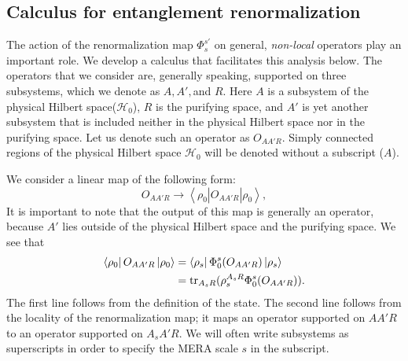 \documentclass[a4paper,11pt]{article}
\newcommand{\bra}[1]{\left\langle #1 \right|}
\newcommand{\ket}[1]{\left|#1\right\rangle}
\newcommand{\1}{\mathbbm{1}}
\newcommand{\cH}{\mathcal{H}}
\newcommand{\tr}{{\rm tr}}
\begin{document}
\subsection{Calculus for entanglement renormalization}
The action of the renormalization map $\Phi_s^{s'}$ on general, \emph{non-local} operators play an important role. We develop a calculus that facilitates this analysis below. The operators that we consider are, generally speaking, supported on three subsystems, which we denote as $A,A', $and $R$. Here $A$ is a subsystem of the physical Hilbert space($\mathcal{H}_0$), $R$ is the purifying space, and $A'$ is yet another subsystem that is included neither in the physical Hilbert space nor in the purifying space. Let us denote such an operator as $O_{AA'R}$. Simply connected regions of the physical Hilbert space $\cH_0$ will be denoted without a subscript ($A$).

We consider a linear map of the following form:
\begin{equation}
O_{AA'R} \to \bra{\rho_0} O_{AA'R} \ket{\rho_0},
\end{equation}
It is important to note that the output of this map is generally an operator, because $A'$ lies outside of the physical Hilbert space and the purifying space. We see that
\begin{align}
\bra{\rho_0} O_{AA'R} \ket{\rho_0} &= \bra{\rho_s} \Phi_{0}^{s}(O_{AA'R})\ket{\rho_s} \nonumber \\
&= \tr_{A_sR}(\rho_s^{A_sR} \Phi_0^s(O_{AA'R})).\label{eq:renormalization_identity}
 \end{align}
The first line follows from the definition of the state. The second line follows from the locality of the renormalization map; it maps an operator supported on $AA'R$ to an operator supported on $A_sA'R$. We will often write subsystems as superscripts in order to specify the MERA scale $s$ in the subscript.
\end{document}
